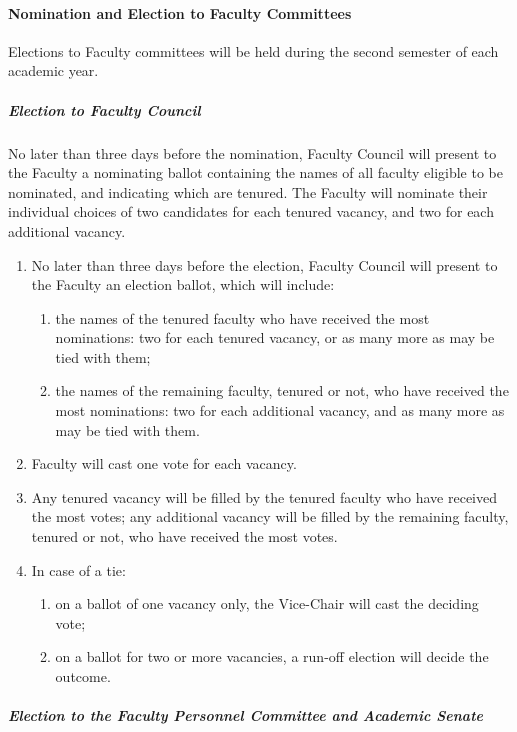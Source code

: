\documentclass[letterpaper, 11pt]{article}
\newcounter{subsubparagraph}
\begin{document}
			\paragraph{	Nomination and Election to Faculty Committees}
				Elections to Faculty committees will be held during the second semester of each academic year.
				\subparagraph{Election to Faculty Council}
					No later than three days before the nomination, Faculty Council will present to the Faculty a nominating ballot containing the names of all faculty eligible to be nominated, and indicating which are tenured.  The Faculty will nominate their individual choices of two candidates for each tenured vacancy, and two for each additional vacancy.
					\begin{enumerate}[label=\alph*)]
						\item{No later than three days before the election, Faculty Council will present to the Faculty an election ballot, which will include:
							\begin{enumerate}[label=\arabic*)]
								\item{the names of the tenured faculty who have received the most nominations:  two for each tenured vacancy, or as many more as may be tied with them;}
								\item{the names of the remaining faculty, tenured or not, who have received the most nominations:  two for each additional vacancy, and as many more as may be tied with them.}
							\end{enumerate}
						}
						\item{Faculty will cast one vote for each vacancy.}
						\item{Any tenured vacancy will be filled by the tenured faculty who have received the most votes; any additional vacancy will be filled by the remaining faculty, tenured or not, who have received the most votes.}
						\item{In case of a tie:
							\begin{enumerate}[label=\arabic*)]
								\item{on a ballot of one vacancy only, the Vice-Chair will cast the deciding vote;}
								\item{on a ballot for two or more vacancies, a run-off election will decide the outcome.}
							\end{enumerate}
						}
					\end{enumerate}
				\subparagraph{Election to the Faculty Personnel Committee and Academic Senate}
\end{document}
